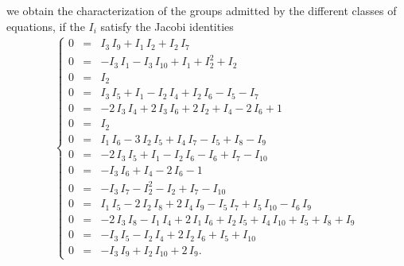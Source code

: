 we obtain the characterization of the groups admitted by the different 
classes of equations, if the $I_{i}$ satisfy the Jacobi identities
\begin{eqnarray}
\label{jacobi}
\left\{
\begin{array}{rcl}
0&=& I_{3}\,I_{9} + I_{1}\,I_{2} + I_{2}\,I_{7} \\
0&=&  - I_{3}\,I_{1} - I_{3}\,I_{10} + I_{1} + I_{2}^{2}  + I_{2} \\
0&=& I_{2} \\
0&=& I_{3}\,I_{5} + I_{1} - I_{2}\,I_{4} + I_{2}\,I_{6} - I_{5} - I_{7} \\
0&=&  - 2\,I_{3}\,I_{4} + 2\,I_{3}\,I_{6} + 2\,I_{2} + I_{4} - 2\,I_{6} + 1 \\
0&=& I_{2} \\
0&=& I_{1}\,I_{6} - 3\,I_{2}\,I_{5} + I_{4}\,I_{7} - I_{5} + I_{8} - I_{9} \\
0&=&  - 2\,I_{3}\,I_{5} + I_{1} - I_{2}\,I_{6} - I_{6} + I_{7} - I_{10} \\
0&=&  - I_{3}\,I_{6} + I_{4} - 2\,I_{6} - 1 \\
0&=&  - I_{3}\,I_{7} - I_{2}^{2}  - I_{2} + I_{7} - I_{10} \\
0&=& I_{1}\,I_{5} - 2\,I_{2}\,I_{8} + 2\,I_{4}\,I_{9} 
- I_{5}\,I_{7} + I_{5}\,I_{10} - I_{6}\,I_{9} \\
0&=&  - 2\,I_{3}\,I_{8} - I_{1}\,I_{4} + 2\,I_{1}\,I_{6} + I_{2}\,I_{5} 
+ I_{4}\,I_{10} + I_{5} + I_{8} + I_{9} \\
0&=&  - I_{3}\,I_{5} - I_{2}\,I_{4} + 2\,I_{2}\,I_{6} + I_{5} + I_{10} \\
0&=&  - I_{3}\,I_{9} + I_{2}\,I_{10} + 2\,I_{9}.
\end{array} \right.
\end{eqnarray}

